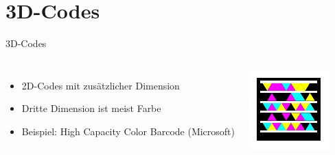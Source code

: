 \section{3D-Codes}

\begin{frame}{3D-Codes}
	\begin{columns}
		\begin{itemize}
		\item 2D-Codes mit zusätzlicher Dimension
		\item Dritte Dimension ist meist Farbe
		\item Beispiel: High Capacity Color Barcode (Microsoft)
		\end{itemize}
		\includegraphics[width=\textwidth]{muzy/3d-hccb.pdf}
	\end{columns}
\end{frame}

